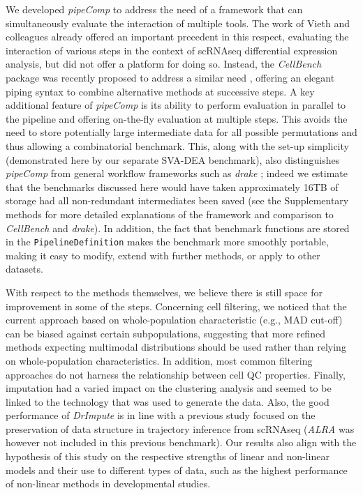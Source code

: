 \documentclass{bmcart}
\begin{document}
We developed \textit{pipeComp} to address the need of a framework that can simultaneously evaluate the interaction of multiple tools. The work of Vieth and colleagues\cite{viethSystematic2019} already offered an important precedent in this respect, evaluating the interaction of various steps in the context of scRNAseq differential expression analysis, but did not offer a platform for doing so. Instead, the \textit{CellBench} package was recently proposed to address a similar need \cite{suCellbench}, offering an elegant piping syntax to combine alternative methods at successive steps. A key additional feature of \textit{pipeComp} is its ability to perform evaluation in parallel to the pipeline and offering on-the-fly evaluation at {\color{red}multiple steps. This avoids the need to store potentially large intermediate data for all possible permutations and thus allowing a combinatorial benchmark. This, along with the set-up simplicity (demonstrated here by our separate SVA-DEA benchmark), also distinguishes \textit{pipeComp} from general workflow frameworks such as \textit{drake} \citep{landauDrakePackage2018}; indeed we estimate that the benchmarks discussed here would have taken approximately 16TB of storage had all non-redundant intermediates been saved (see the Supplementary methods for more detailed explanations of the framework and comparison to \textit{CellBench} and \textit{drake}).} In addition, the fact that benchmark functions are stored in the \texttt{PipelineDefinition} makes the benchmark more smoothly portable, making it easy to modify, extend with further methods, or apply to other datasets.

With respect to the methods themselves, we believe there is still space for improvement in some of the steps. Concerning cell filtering, we noticed that the current approach based on whole-population characteristic (e.g., MAD cut-off) can be biased against certain subpopulations, suggesting that more refined methods expecting multimodal distributions should be used rather than relying on whole-population characteristics. In addition, most common filtering approaches do not harness the relationship between cell QC properties. Finally, imputation had a varied impact on the clustering analysis and seemed to be linked to the technology that was used to generate the data. Also, the good performance of \textit{DrImpute} is in line with a previous study focused on the preservation of data structure in trajectory inference from scRNAseq \cite{ZhangImput2018} (\textit{ALRA} was however not included in this previous benchmark). Our results also align with the hypothesis of this study on the respective strengths of linear and non-linear models and their use to different types of data, such as the highest performance of non-linear methods in developmental studies. 
\end{document}
